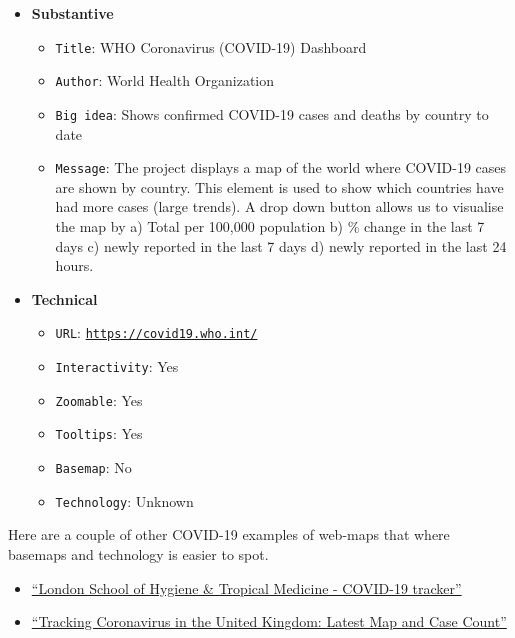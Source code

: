 \documentclass[
  letterpaper,
  DIV=11,
  numbers=noendperiod]{scrreprt}
\providecommand{\tightlist}{%
  \setlength{\itemsep}{0pt}\setlength{\parskip}{0pt}}\usepackage{longtable,booktabs,array}
\begin{document}
\begin{itemize}
\item
  \textbf{Substantive}

  \begin{itemize}
  \tightlist
  \item
    \texttt{Title}: WHO Coronavirus (COVID-19) Dashboard
  \item
    \texttt{Author}: World Health Organization
  \item
    \texttt{Big\ idea}: Shows confirmed COVID-19 cases and deaths by
    country to date
  \item
    \texttt{Message}: The project displays a map of the world where
    COVID-19 cases are shown by country. This element is used to show
    which countries have had more cases (large trends). A drop down
    button allows us to visualise the map by a) Total per 100,000
    population b) \% change in the last 7 days c) newly reported in the
    last 7 days d) newly reported in the last 24 hours.
  \end{itemize}
\item
  \textbf{Technical}

  \begin{itemize}
  \tightlist
  \item
    \texttt{URL}:
    \href{https://covid19.who.int/}{\texttt{https://covid19.who.int/}}
  \item
    \texttt{Interactivity}: Yes
  \item
    \texttt{Zoomable}: Yes
  \item
    \texttt{Tooltips}: Yes
  \item
    \texttt{Basemap}: No
  \item
    \texttt{Technology}: Unknown
  \end{itemize}
\end{itemize}

Here are a couple of other COVID-19 examples of web-maps that where
basemaps and technology is easier to spot.

\begin{itemize}
\tightlist
\item
  \href{https://vac-lshtm.shinyapps.io/ncov_tracker/?_ga=2.246644480.501918083.1674819300-1251881958.1674819300}{``London
  School of Hygiene \& Tropical Medicine - COVID-19 tracker''}
\item
  \href{https://www.nytimes.com/interactive/2021/world/united-kingdom-covid-cases.html}{``Tracking
  Coronavirus in the United Kingdom: Latest Map and Case Count''}
\end{itemize}
\end{document}
